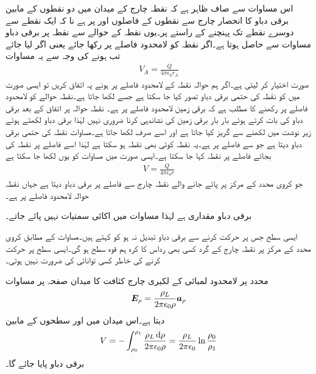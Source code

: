 اس مساوات سے صاف ظاہر ہے کہ نقطہ چارج  کے میدان میں دو نقطوں کے مابین برقی دباو کا انحصار چارج سے نقطوں کے فاصلوں  اور  پر ہے نا کہ ایک نقطے سے دوسرے نقطے تک پہنچنے کے راستے پر۔یوں نقطہ  کے حوالے سے نقطہ  پر برقی دباو مساوات  سے حاصل ہوتا ہے۔اگر نقطہ  کو لامحدود فاصلے پر رکھا جائے یعنی اگر  لیا جائے تب  ہونے کی وجہ سے  یہ مساوات
\begin{align}\label{مساوات_توانائی_نقطہ_چارج_کی_حتمی_دباو}
V_{A}=\frac{Q}{4\pi \epsilon_0 r_A}
\end{align}
صورت اختیار کر لیتی ہے۔اگر ہم  حوالہ نقطہ کے لامحدود فاصلے پر ہونے پہ اتفاق کریں تو ایسی صورت میں  کو نقطہ  کی حتمی برقی دباو تصور کیا جا سکتا ہے جسے  لکھا جاتا ہے۔نقطہ حوالے کو لامحدود فاصلے پر رکھنے کا مطلب ہے کہ برقی زمین لامحدود فاصلے پر ہے۔ نقطہ حوالہ پر اتفاق کے بعد برقی دباو کی بات کرتے ہوئے بار بار برقی زمین کی نشاندہی کرنا ضروری نہیں لہٰذا برقی دباو لکھتے ہوئے زیر نوشت میں  لکھنے سے گریز کیا جاتا ہے اور اسے صرف  لکھا جاتا ہے۔مساوات  نقطہ  کی حتمی برقی دباو دیتا ہے جو  سے  فاصلے پر ہے۔یہ نقطہ کوئی بھی نقطہ ہو سکتا ہے لہٰذا  اسے   فاصلے پر نقطہ  کی بجائے  فاصلے پر نقطہ کہا جا سکتا ہے۔ایسی صورت میں مساوات  کو یوں لکھا جا سکتا ہے
\begin{align}\label{مساوات_توانائی_نقطہ_چارج_کی_حتمی_دباو_الف}
V=\frac{Q}{4\pi \epsilon_0 r}
\end{align}
جو کروی محدد کے مرکز پر پائے جانے والے نقطہ چارج  سے  فاصلے پر برقی دباو  دیتا ہے جہاں نقطہ حوالہ لامحدود فاصلے پر ہے۔

برقی دباو مقداری ہے لہٰذا مساوات  میں اکائی سمتیات نہیں پائے جاتے۔

ایسی سطح جس پر حرکت کرنے سے برقی دباو تبدیل نہ ہو کو  کہتے ہیں۔مساوات  کے مطابق کروی محدد کے مرکز پر نقطہ چارج کے گرد کسی بھی رداس کا کرہ ہم قوہ سطح ہو گی۔ایسی سطح پر حرکت کرنے کی خاطر کسی توانائی کی ضرورت نہیں ہوتی۔

 محدد پر لامحدود لمبائی کے لکیری چارج کثافت کا میدان صفحہ  پر مساوات 
\begin{align*}
{\ensuremath{{\boldsymbol{E}}}}_\rho=\frac{\rho_L}{2\pi \epsilon_0\rho} {\boldsymbol{a}}_{\rho}
\end{align*}
دیتا ہے۔اس میدان میں  اور  سطحوں کے مابین
\begin{align}\label{مساوات_توانائی_لکیری_چارج_برقی_دباو}
V=-\int_{\rho_0}^{\rho_1} \frac{\rho_L  \dif \rho}{2\pi \epsilon_0\rho} =\frac{\rho_L}{2\pi\epsilon_0} \ln \frac{\rho_0}{\rho_1}
\end{align}
برقی دباو پایا جائے گا۔ 

